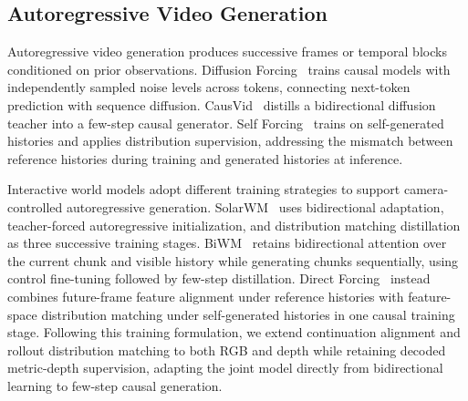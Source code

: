 \subsection{Autoregressive Video Generation}
\label{sec:rw_autoregressive}

Autoregressive video generation produces successive frames or temporal blocks conditioned on prior observations.
Diffusion Forcing~\cite{chen2024diffusionforcingnexttokenprediction} trains causal models with independently sampled noise levels across tokens, connecting next-token prediction with sequence diffusion.
CausVid~\cite{yin2025slowbidirectionalfastautoregressive} distills a bidirectional diffusion teacher into a few-step causal generator.
Self Forcing~\cite{huang2025selfforcingbridgingtraintest} trains on self-generated histories and applies distribution supervision, addressing the mismatch between reference histories during training and generated histories at inference.

Interactive world models adopt different training strategies to support camera-controlled autoregressive generation.
SolarWM~\cite{huang2026solarwmopendatascalable} uses bidirectional adaptation, teacher-forced autoregressive initialization, and distribution matching distillation as three successive training stages.
BiWM~\cite{rui2026biwmadvancingopensourceinteractive} retains bidirectional attention over the current chunk and visible history while generating chunks sequentially, using control fine-tuning followed by few-step distillation.
Direct Forcing~\cite{xu2026directforcingsinglestagetraining} instead combines future-frame feature alignment under reference histories with feature-space distribution matching under self-generated histories in one causal training stage.
Following this training formulation, we extend continuation alignment and rollout distribution matching to both RGB and depth while retaining decoded metric-depth supervision, adapting the joint model directly from bidirectional learning to few-step causal generation.
